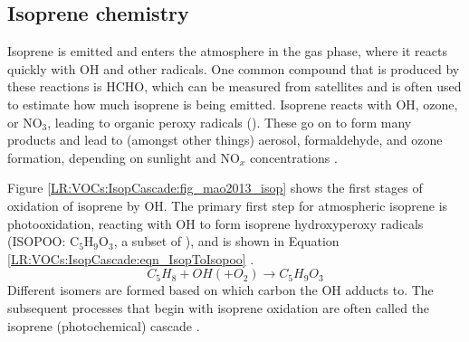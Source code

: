   \subsection{Isoprene chemistry}
    \label{LR:VOCs:IsopCascade}
    
    Isoprene is emitted and enters the atmosphere in the gas phase, where it reacts quickly with OH and other radicals.
    One common compound that is produced by these reactions is HCHO, which can be measured from satellites and is often used to estimate how much isoprene is being emitted.
    Isoprene reacts with OH, ozone, or NO$_3$, leading to organic peroxy radicals (\roo).
    These go on to form many products and lead to (amongst other things) aerosol, formaldehyde, and ozone formation, depending on sunlight and NO$_x$ concentrations \parencite{Atkinson2000}.
    
    
    
    Figure \ref{LR:VOCs:IsopCascade:fig_mao2013_isop} shows the first stages of oxidation of isoprene by OH.
    The primary first step for atmospheric isoprene is photooxidation, reacting with OH to form isoprene hydroxyperoxy radicals (ISOPOO: C$_5$H$_9$O$_3$, a subset of \roo), and is shown in Equation \ref{LR:VOCs:IsopCascade:eqn_IsopToIsopoo} \parencite{Patchen2007, Wolfe2016, Marvin2017}.
    \begin{equation} \label{LR:VOCs:IsopCascade:eqn_IsopToIsopoo}
    C_5H_8 + OH (+ O_2) \rightarrow C_5H_9O_3\dot{}
    \end{equation}
    Different isomers are formed based on which carbon the OH adducts to.
    The subsequent processes that begin with isoprene oxidation are often called the isoprene (photochemical) cascade \parencite[e.g.,][]{Crounse2012, Paulot2012, Wolfe2016}.
    
    
    
    
